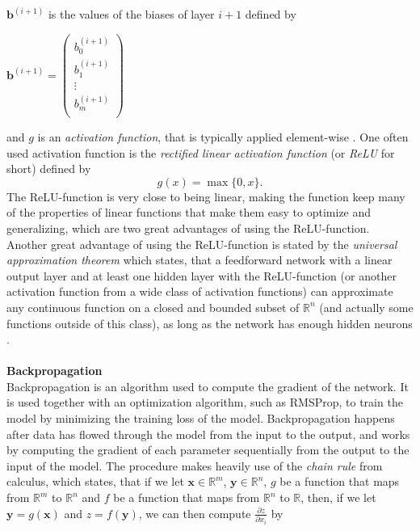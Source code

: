 \documentclass[./main.tex]{subfiles}
\begin{document}
$\bm{b}^{(i + 1)}$ is the values of the biases of layer $i + 1$ defined by
\begin{center}
    \begin{math}
        \bm{b}^{(i + 1)} =
        \begin{pmatrix}
            b_{0} ^{(i + 1)} \\
            b_{1} ^{(i + 1)} \\
            \vdots \\
            b_{m} ^{(i + 1)} \\
        \end{pmatrix}
    \end{math}
\end{center}
and $g$ is an \textit{activation function}, that is typically applied element-wise \cite{DeepLearning} \cite{3b1b_1}. One often used activation function is the \textit{rectified linear activation function} (or \textit{ReLU} for short) defined by
$$g(x) = \max\{0, x\}.$$
The ReLU-function is very close to being linear, making the function keep many of the properties of linear functions that make them easy to optimize and generalizing, which are two great advantages of using the ReLU-function. Another great advantage of using the ReLU-function is stated by the \textit{universal approximation theorem} which states, that a feedforward network with a linear output layer and at least one hidden layer with the ReLU-function (or another activation function from a wide class of activation functions) can approximate any continuous function on a closed and bounded subset of $\mathbb{R}^n$ (and actually some functions outside of this class), as long as the network has enough hidden neurons \cite{DeepLearning}. 
\\
\\
\noindent \textbf{Backpropagation} \\
Backpropagation is an algorithm used to compute the gradient of the network. It is used together with an optimization algorithm, such as RMSProp, to train the model by minimizing the training loss of the model. Backpropagation happens after data has flowed through the model from the input to the output, and works by computing the gradient of each parameter sequentially from the output to the input of the model. The procedure makes heavily use of the \textit{chain rule} from calculus, which states, that if we let $\bm{x} \in \mathbb{R}^m$, $\bm{y} \in \mathbb{R}^n$, $g$ be a function that maps from $\mathbb{R}^m$ to $\mathbb{R}^n$ and $f$ be a function that maps from $\mathbb{R}^n$ to $\mathbb{R}$, then, if we let $\bm{y} = g(\bm{x})$ and $z = f(\bm{y})$, we can then compute $\frac{\partial z}{\partial x_i}$ by
\end{document}
